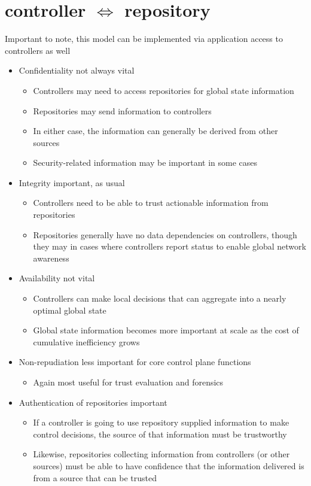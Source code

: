 \documentclass[12pt,letterpaper]{article}
\begin{document}
\newpage
\section{controller $\Longleftrightarrow$ repository}
Important to note, this model can be implemented via application access to controllers as well
\begin{itemize}
\item {\color{orange} Confidentiality not always vital}
	\begin{itemize}
	\item Controllers may need to access repositories for global state information
	\item Repositories may send information to controllers
	\item In either case, the information can generally be derived from other sources
	\item Security-related information may be important in some cases
	\end{itemize}
\item {\color{red} Integrity important, as usual}
	\begin{itemize}
	\item Controllers need to be able to trust actionable information from repositories
	\item Repositories generally have no data dependencies on controllers, though they may in cases where controllers report status to enable global network awareness
	\end{itemize}
\item {\color{green} Availability not vital} 
	\begin{itemize}
	\item Controllers can make local decisions that can aggregate into a nearly optimal global state
	\item Global state information becomes more important at scale as the cost of cumulative inefficiency grows
	\end{itemize}
\item {\color{green} Non-repudiation less important for core control plane functions}
	\begin{itemize}
	\item Again most useful for trust evaluation and forensics
	\end{itemize}
\item {\color{red} Authentication of repositories important}
	\begin{itemize}
	\item If a controller is going to use repository supplied information to make control decisions, the source of that information must be trustworthy
	\item Likewise, repositories collecting information from controllers (or other sources) must be able to have confidence that the information delivered is from a source that can be trusted
	\end{itemize}
\end{itemize}
\end{document}
